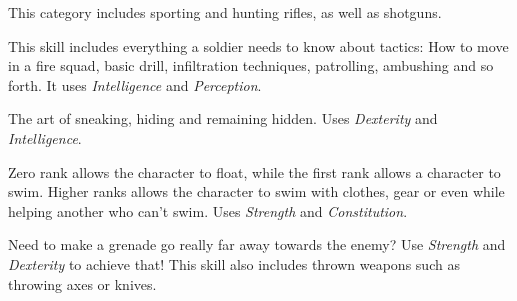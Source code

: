 \begin{description}
   This category includes sporting and
  hunting rifles, as well as shotguns.

   This skill includes everything a soldier needs to
  know about tactics: How to move in a fire squad, basic drill, infiltration
  techniques, patrolling, ambushing and so forth. It uses \emph{Intelligence} and
  \emph{Perception}.

   The art of sneaking, hiding and remaining hidden. Uses
  \emph{Dexterity} and \emph{Intelligence}.

   Zero rank allows the character to float, while the first rank
  allows a character to swim. Higher ranks allows the character to swim with
  clothes, gear or even while helping another who can't swim. Uses \emph{Strength}
  and \emph{Constitution}.

   Need to make a grenade go really far away towards the enemy?
  Use \emph{Strength} and \emph{Dexterity} to achieve that! This skill also
  includes thrown weapons such as throwing axes or knives.
\end{description}
